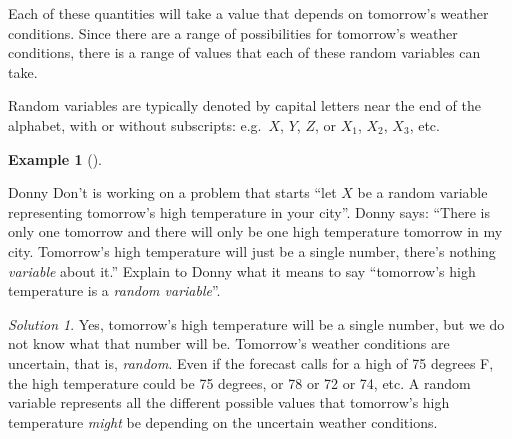 \documentclass[
  letterpaper,
  DIV=11,
  numbers=noendperiod]{scrreprt}
\theoremstyle{plain}
\theoremstyle{definition}
\newtheorem{example}{Example}[chapter]
\theoremstyle{definition}
\theoremstyle{definition}
\theoremstyle{remark}
\newtheorem{refsolution}{Solution}[chapter]
\begin{document}
Each of these quantities will take a value that depends on tomorrow's
weather conditions. Since there are a range of possibilities for
tomorrow's weather conditions, there is a range of values that each of
these random variables can take.

Random variables are typically denoted by capital letters near the end
of the alphabet, with or without subscripts: e.g.~\(X\), \(Y\), \(Z\),
or \(X_1\), \(X_2\), \(X_3\), etc.

\begin{tcolorbox}[enhanced jigsaw, opacityback=0, left=2mm, colframe=quarto-callout-note-color-frame, toprule=.15mm, breakable, colback=white, leftrule=.75mm, arc=.35mm, rightrule=.15mm, bottomrule=.15mm]

\begin{example}[]\protect\hypertarget{exm-dd-rv-versus-number}{}\label{exm-dd-rv-versus-number}

Donny Don't is working on a problem that starts ``let \(X\) be a random
variable representing tomorrow's high temperature in your city''. Donny
says: ``There is only one tomorrow and there will only be one high
temperature tomorrow in my city. Tomorrow's high temperature will just
be a single number, there's nothing \emph{variable} about it.'' Explain
to Donny what it means to say ``tomorrow's high temperature is a
\emph{random variable}''.

\end{example}

\end{tcolorbox}

\begin{tcolorbox}[enhanced jigsaw, opacityback=0, rightrule=.15mm, coltitle=black, colframe=quarto-callout-tip-color-frame, toprule=.15mm, colbacktitle=quarto-callout-tip-color!10!white, opacitybacktitle=0.6, left=2mm, toptitle=1mm, breakable, title={Solution (click to expand)}, bottomtitle=1mm, colback=white, leftrule=.75mm, titlerule=0mm, arc=.35mm, bottomrule=.15mm]

\begin{refsolution}
Yes, tomorrow's high temperature will be a single number, but we do not
know what that number will be. Tomorrow's weather conditions are
uncertain, that is, \emph{random}. Even if the forecast calls for a high
of 75 degrees F, the high temperature could be 75 degrees, or 78 or 72
or 74, etc. A random variable represents all the different possible
values that tomorrow's high temperature \emph{might} be depending on the
uncertain weather conditions.

\label{sol-dd-rv-versus-number}

\end{refsolution}

\end{tcolorbox}
\end{document}
